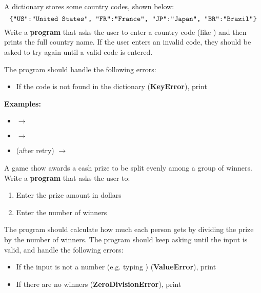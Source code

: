 		A dictionary stores some country codes, shown below: 
			$$\texttt{\{\csq{US}:\csq{United States}, \csq{FR}:\csq{France}, 
				\csq{JP}:\csq{Japan}, \csq{BR}:\csq{Brazil}\}}$$
		Write a \textbf{program} that asks the user to enter a country code (like ) 
		and then prints the full country name. If the user enters an invalid code, they should 
		be asked to try again until a valid code is entered.

		The program should handle the following errors:
		\begin{itemize}
			\item If the code is not found in the dictionary (\textbf{KeyError}), 
				print 
		\end{itemize}

		\textbf{Examples:}
		\begin{itemize}
			\item {}  $\rightarrow$ 
			\item {}  $\rightarrow$ 
			\item (after retry)   $\rightarrow$ 
		\end{itemize}



	\item 
		A game show awards a cash prize to be split evenly among a group of winners.  
		Write a \textbf{program} that asks the user to:
		\begin{enumerate}
			\item Enter the prize amount in dollars
			\item Enter the number of winners
		\end{enumerate}

		The program should calculate how much each person gets by dividing the prize by the 
		number of winners.
		The program should keep asking until the input is valid, and handle the following errors:
		\begin{itemize}
			\item If the input is not a number (e.g. typing ) (\textbf{ValueError}), 
				print 
			\item If there are no winners (\textbf{ZeroDivisionError}), 
				print 
		\end{itemize}

